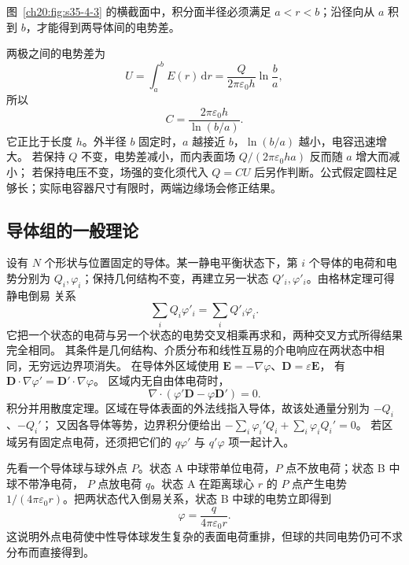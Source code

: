 {图~\ref{ch20:fig:s35-4-3} 的横截面中，积分面半径必须满足 $a<r<b$；沿径向从 $a$ 积到 $b$，才能得到两导体间的电势差。

\par\noindent\begin{minipage}{\linewidth}
\coaxialCapacitorFigure
{}\label{ch20:fig:s35-4-3}
\end{minipage}\par\medskip

两极之间的电势差为
\[
  U=\int_a^bE(r)\,\mathrm dr
   =\frac{Q}{2\pi\varepsilon_0h}\ln\frac ba,
\]
所以
\begin{equation}
  \boxed{C=\frac{2\pi\varepsilon_0h}{\ln(b/a)}}.
\end{equation}
它正比于长度 $h$。外半径 $b$ 固定时，$a$ 越接近 $b$，$\ln(b/a)$ 越小，电容迅速增大。
若保持 $Q$ 不变，电势差减小，而内表面场 $Q/(2\pi\varepsilon_0ha)$ 反而随 $a$ 增大而减小；
若保持电压不变，场强的变化须代入 $Q=CU$ 后另作判断。公式假定圆柱足够长；实际电容器尺寸有限时，两端边缘场会修正结果。


\subsection{导体组的一般理论}


设有 $N$ 个形状与位置固定的导体。某一静电平衡状态下，第 $i$ 个导体的电荷和电势分别为
$Q_i,\varphi_i$；保持几何结构不变，再建立另一状态 $Q'_i,\varphi'_i$。由格林定理可得静电倒易
关系
\begin{equation}
  \boxed{\sum_iQ_i\varphi'_i=\sum_iQ'_i\varphi_i}.
\end{equation}
它把一个状态的电荷与另一个状态的电势交叉相乘再求和，两种交叉方式所得结果完全相同。
其条件是几何结构、介质分布和线性互易的介电响应在两状态中相同，无穷远边界项消失。
在导体外区域使用 $\boldsymbol E=-\nabla\varphi$、$\boldsymbol D=\varepsilon\boldsymbol E$，
有 $\boldsymbol D\cdot\nabla\varphi'=\boldsymbol D'\cdot\nabla\varphi$。
区域内无自由体电荷时，
\[
 \nabla\cdot(\varphi'\boldsymbol D-\varphi\boldsymbol D')=0.
\]
积分并用散度定理。区域在导体表面的外法线指入导体，故该处通量分别为 $-Q_i$、$-Q_i'$；
又因各导体等势，边界积分便给出
$-\sum_i\varphi_i'Q_i+\sum_i\varphi_iQ_i'=0$。
若区域另有固定点电荷，还须把它们的 $q\varphi'$ 与 $q'\varphi$ 项一起计入。

先看一个导体球与球外点 $P$。状态 A 中球带单位电荷，$P$ 点不放电荷；状态 B 中球不带净电荷，
$P$ 点放电荷 $q$。状态 A 在距离球心 $r$ 的 $P$ 点产生电势
$1/(4\pi\varepsilon_0r)$。把两状态代入倒易关系，状态 B 中球的电势立即得到
\[
  \varphi=\frac{q}{4\pi\varepsilon_0r}.
\]
这说明外点电荷使中性导体球发生复杂的表面电荷重排，但球的共同电势仍可不求分布而直接得到。

}
